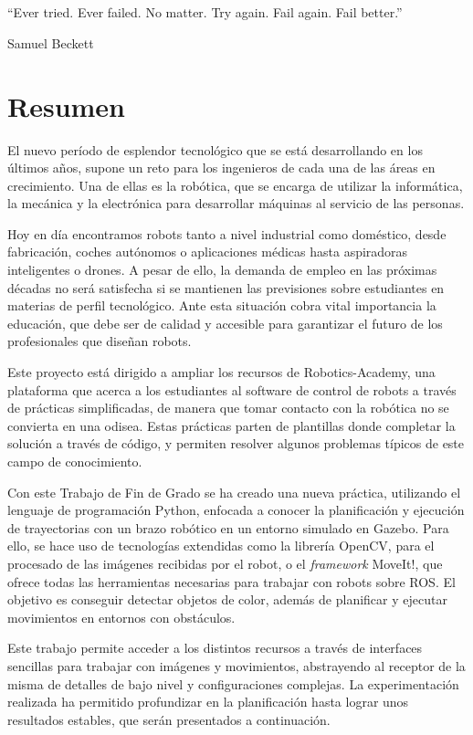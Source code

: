 \documentclass[12pt,spanish,chapterprefix, numbers=noenddot]{book}
\numberwithin{equation}{section}
\numberwithin{figure}{section}
\begin{document}
\chapter*{}
\epigraph{“Ever tried. Ever failed. No matter. Try again. Fail again. Fail better.”}{Samuel Beckett}


\chapter*{Resumen}
El nuevo período de esplendor tecnológico que se está desarrollando en los últimos años, supone un reto para los ingenieros de cada una de las áreas en crecimiento. Una de ellas es la robótica, que se encarga de utilizar la informática, la mecánica y la electrónica para desarrollar máquinas al servicio de las personas. 

Hoy en día encontramos robots tanto a nivel industrial como doméstico, desde fabricación, coches autónomos o aplicaciones médicas hasta aspiradoras inteligentes o drones. A pesar de ello, la demanda de empleo en las próximas décadas no será satisfecha si se mantienen las previsiones sobre estudiantes en materias de perfil tecnológico. Ante esta situación cobra vital importancia la educación, que debe ser de calidad y accesible para garantizar el futuro de los profesionales que diseñan robots. 

Este proyecto está dirigido a ampliar los recursos de Robotics-Academy, una plataforma que acerca a los estudiantes al software de control de robots a través de prácticas simplificadas, de manera que tomar contacto con la robótica no se convierta en una odisea. Estas prácticas parten de plantillas donde completar la solución a través de código, y permiten resolver algunos problemas típicos de este campo de conocimiento. 

Con este Trabajo de Fin de Grado se ha creado una nueva práctica, utilizando el lenguaje de programación Python, enfocada a conocer la planificación y ejecución de trayectorias con un brazo robótico en un entorno simulado en Gazebo. Para ello, se hace uso de tecnologías extendidas como la librería OpenCV, para el procesado de las imágenes recibidas por el robot, o el \textit{framework} MoveIt!, que ofrece todas las herramientas necesarias para trabajar con robots sobre ROS. El objetivo es conseguir detectar objetos de color, además de planificar y ejecutar movimientos en entornos con obstáculos. 

Este trabajo permite acceder a los distintos recursos a través de interfaces sencillas para trabajar con imágenes y movimientos, abstrayendo al receptor de la misma de detalles de bajo nivel y configuraciones complejas. La experimentación realizada ha permitido profundizar en la planificación hasta lograr unos resultados estables, que serán presentados a continuación.  
\end{document}
